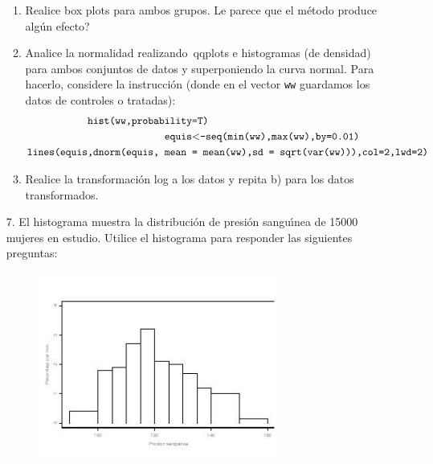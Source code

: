 \documentclass[11pt,a4paper,twoside]{article}%
\begin{document}
\begin{enumerate}
\begin{enumerate}
\item Realice box plots para ambos grupos. \textquestiondown Le parece que el
m\'{e}todo produce alg\'{u}n efecto?

\item Analice la normalidad realizando\ qqplots e histogramas (de densidad)
para ambos conjuntos de datos y superponiendo la curva normal. Para hacerlo,
considere la instrucci\'{o}n (donde en el vector \texttt{ww} guardamos los
datos de controles o tratadas):%
\begin{align*}
\text{\texttt{hist(ww,probability}} &  \text{\texttt{=T)}}\\
\text{\texttt{equis}} &  \text{\texttt{%
$<$%
-seq(min(ww),max(ww),by=0.01)}}\\
\text{\texttt{lines(equis,dnorm(equis,\ mean\ }} &
\text{\texttt{=\ mean(ww),sd\ =\ sqrt(var(ww))),col=2,lwd=2)}}%
\end{align*}


\item Realice la transformaci\'{o}n log a los datos y repita b) para los datos transformados.
\end{enumerate}

\item[7.] El histograma muestra la distribuci\'{o}n de presi\'{o}n
sangu\'{\i}nea de 15000 mujeres en estudio. Utilice el histograma para
responder las siguientes preguntas:%

\begin{figure}
[ht]
\begin{center}
\includegraphics[width=0.75\textwidth]
{histogramadescriptiva.jpg}%
\end{center}
\end{figure}



\end{enumerate}
\end{document}
